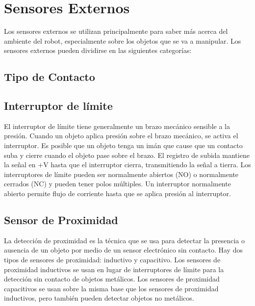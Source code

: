 \section{Sensores Externos}
Los sensores externos se utilizan principalmente para saber más acerca del ambiente del robot, especialmente sobre los objetos que se va a manipular. Los sensores externos pueden
dividirse en las siguientes categorías:

\subsection{Tipo de Contacto}

\subsection*{\quad\textbf{Interruptor de límite}}
El interruptor de límite tiene generalmente un brazo mecánico sensible a la presión. Cuando un objeto aplica presión sobre el brazo mecánico, se activa el interruptor. Es posible que un objeto tenga un imán que cause que un contacto suba y cierre cuando el objeto pase sobre el brazo. El registro de subida mantiene la señal en +V hasta que el interruptor cierra, transmitiendo la señal a tierra.\linebreak
Los interruptores de límite pueden ser normalmente abiertos (NO) o normalmente cerrados (NC) y pueden tener polos múltiples. Un interruptor normalmente abierto permite flujo de corriente hasta que se aplica presión al interruptor. 

\subsection*{\quad\textbf{Sensor de Proximidad}}
La detección de proximidad es la técnica que se usa para detectar la presencia o ausencia de un objeto por medio de un sensor electrónico sin contacto. Hay dos tipos de sensores de proximidad: inductivo y capacitivo. Los sensores de proximidad inductivos se usan en lugar de interruptores de límite para la detección sin contacto de objetos metálicos. Los sensores de proximidad capacitivos se usan sobre la misma base que los sensores de proximidad inductivos, pero también pueden detectar objetos no metálicos.




\cite{saha2014robotica}
\pagebreak
